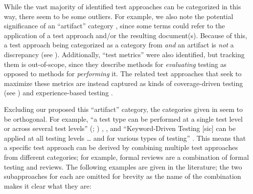 While the vast majority of identified test approaches can be categorized
in this way, \ifnotpaper there seem to be some outliers. For example, \fi
we also note the potential significance of an ``artifact'' category%
, since some terms could refer to the application of
a test approach and/or the resulting document(s). Because of this, a test
approach being categorized as a category from 
\emph{and} an artifact is \emph{not} a discrepancy
(see ). \ifnotpaper
    Additionally, ``test metrics'' were also identified,
    but tracking them is out-of-scope, since they describe methods for
    \emph{evaluating} testing as opposed to methods for \emph{performing} it.
    The related test approaches that seek to maximize these metrics are instead
    captured as kinds of coverage-driven testing (see ) and
    experience-based testing \citep[p.~34]{IEEE2022}.

    \afterpage{
        \begin{landscape}
            \ieeeCatsTable{}
            \newpage
            \otherCatsTable{}
        \end{landscape}
    }
\fi
Excluding \ifnotpaper our proposed \else this \fi ``artifact'' category, the
categories given in  seem to be orthogonal. For
example, ``a test type can be performed at a single test level or across
several test levels''
\ifnotpaper
    (\citealp[p.~15]{IEEE2022}; \citeyear[p.~7]{IEEE2021})%
\else
    \cite[p.~15]{IEEE2022}, \cite[p.~7]{IEEE2021}%
\fi, and ``Keyword-Driven Testing [sic] can be applied at all testing levels
\dots{} and for various types of testing'' \citeyearpar[p.~4]{IEEE2016}.
This means that a specific test approach can be derived by combining multiple
test approaches from different categories; for example, formal reviews are a
combination of formal testing and reviews. \ifnotpaper The following examples
    are given in the literature; the two subapproaches for each are omitted
    for brevity as the name of the combination makes it clear what they are:

